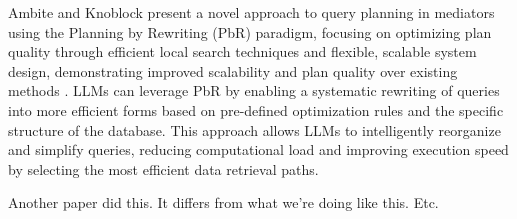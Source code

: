 Ambite and Knoblock present a novel approach to query planning in mediators using the Planning by Rewriting (PbR) paradigm, focusing on optimizing plan quality through efficient local search techniques and flexible, scalable system design, demonstrating improved scalability and plan quality over existing methods \cite{Ambite2000FlexibleQP}. LLMs can leverage PbR by enabling a systematic rewriting of queries into more efficient forms based on pre-defined optimization rules and the specific structure of the database. This approach allows LLMs to intelligently reorganize and simplify queries, reducing computational load and improving execution speed by selecting the most efficient data retrieval paths.

Another paper did this. It differs from what we're doing like this. Etc.
